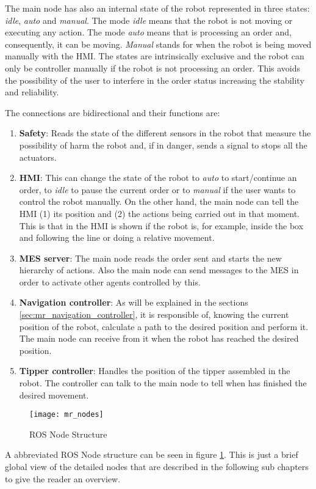 The main node has also an internal state of the robot represented in three states: \emph{idle}, \emph{auto} and \emph{manual}. 
The mode \emph{idle} means that the robot is not moving or executing any action. 
The mode \emph{auto} means that is processing an order and, consequently, it can be moving. \emph{Manual} stands for when the robot is being moved manually with the HMI. 
The states are intrinsically exclusive and the robot can only be controller manually if the robot is not processing an order.
This avoids the possibility of the user to interfere in the order status increasing the stability and reliability.

The connections are bidirectional and their functions are:
\begin{enumerate}
	\item \textbf{Safety}: Reads the state of the different sensors in the robot that measure the possibility of harm the robot and, if in danger, sends a signal to stops all the actuators.  
	\item \textbf{HMI}: This can change the state of the robot to \emph{auto} to start/continue an order, to \emph{idle} to pause the current order or to \emph{manual} if the user wants to control the robot manually. On the other hand, the main node can tell the HMI (1) its position and (2) the actions being carried out in that moment. This is that in the HMI is shown if the robot is, for example, inside the box and following the line or doing a relative movement.
	\item \textbf{MES server}: The main node reads the order sent and starts the new hierarchy of actions. Also the main node can send messages to the MES in order to activate other agents controlled by this.
	\item \textbf{Navigation controller}: As will be explained in the sections \ref{sec:mr_navigation_controller}, it is responsible of, knowing the current position of the robot, calculate a path to the desired position and perform it. The main node can receive from it when the robot has reached the desired position.
	\item \textbf{Tipper controller}: Handles the position of the tipper assembled in the robot. The controller can talk to the main node to tell when has finished the desired movement.
\end{enumerate}

\begin{figure}[H]
	\centering
	\texttt{[image: mr\_nodes]}
	\caption{ROS Node Structure}
	\label{fig:mr_ros_nodes}
\end{figure}
A abbreviated ROS Node structure can be seen in figure \ref{fig:mr_ros_nodes}. This is just a brief global view of the detailed nodes that are described in the following sub chapters to give the reader an overview.


